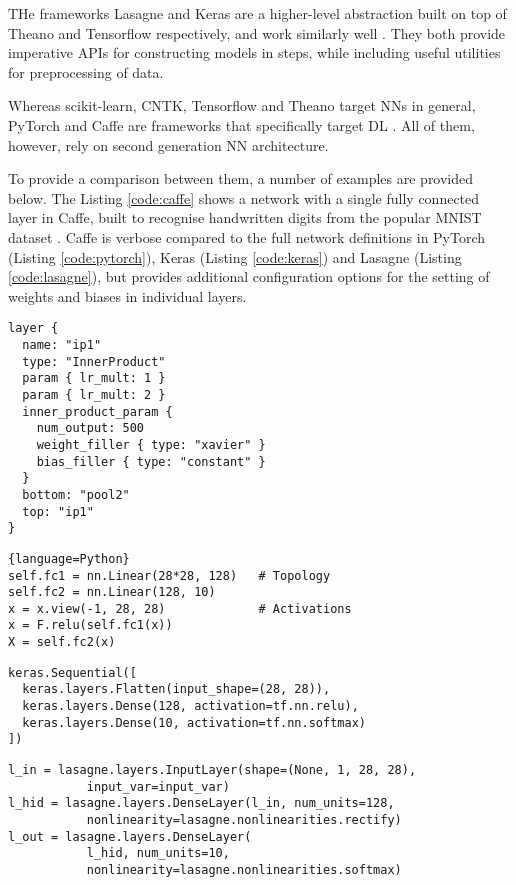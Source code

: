 \documentclass[report.tex]{subfiles}
\begin{document}
THe frameworks Lasagne and Keras are a higher-level abstraction built on top of Theano and Tensorflow respectively,
and work similarly well \cite{Lasagne2018, Keras2018}.
They both provide imperative \gls{API}s for constructing models in steps, while
including useful utilities for preprocessing of data.

Whereas scikit-learn, CNTK, Tensorflow and Theano target \glspl{NN} in general,
PyTorch and Caffe are frameworks that specifically target \gls{DL} 
\cite{PyTorch2018, Caffe2018}.
All of them, however, rely on second generation \gls{NN} architecture.

To provide a comparison between them, a number of examples are provided below.
The Listing \ref{code:caffe} shows a network with a single fully connected
layer in Caffe, built to recognise handwritten digits from the 
popular MNIST dataset \cite{LeCun1998}.
Caffe is verbose compared to the full network definitions in PyTorch 
(Listing \ref{code:pytorch}), Keras (Listing \ref{code:keras}) and
Lasagne (Listing \ref{code:lasagne}), but provides additional 
configuration options for the setting of weights and biases in 
individual layers.

\begin{lstlisting}
layer {
  name: "ip1"
  type: "InnerProduct"
  param { lr_mult: 1 }
  param { lr_mult: 2 }
  inner_product_param {
    num_output: 500
    weight_filler { type: "xavier" }
    bias_filler { type: "constant" }
  }
  bottom: "pool2"
  top: "ip1"
}
\end{lstlisting} \label{code:caffe}

\begin{lstlisting}{language=Python}
self.fc1 = nn.Linear(28*28, 128)   # Topology
self.fc2 = nn.Linear(128, 10)
x = x.view(-1, 28, 28)             # Activations
x = F.relu(self.fc1(x))
X = self.fc2(x)
\end{lstlisting} \label{code:pytorch}

\begin{lstlisting}
keras.Sequential([
  keras.layers.Flatten(input_shape=(28, 28)),
  keras.layers.Dense(128, activation=tf.nn.relu),
  keras.layers.Dense(10, activation=tf.nn.softmax)
])
\end{lstlisting} \label{code:keras}

\begin{lstlisting}
l_in = lasagne.layers.InputLayer(shape=(None, 1, 28, 28),
           input_var=input_var)
l_hid = lasagne.layers.DenseLayer(l_in, num_units=128,
           nonlinearity=lasagne.nonlinearities.rectify)
l_out = lasagne.layers.DenseLayer(
           l_hid, num_units=10,
           nonlinearity=lasagne.nonlinearities.softmax)
\end{lstlisting} \label{code:lasagne}
\end{document}
